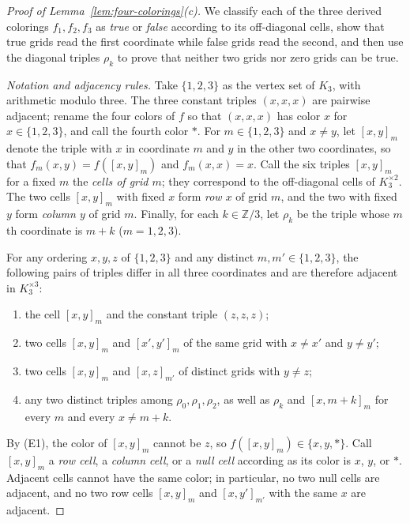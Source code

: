 \begin{proof}[Proof of Lemma~\ref{lem:four-colorings}\textup{(c)}]
We classify each of the three derived colorings $f_1,f_2,f_3$ as \emph{true} or \emph{false} according to its off-diagonal cells, show that true grids read the first coordinate while false grids read the second, and then use the diagonal triples $\rho_k$ to prove that neither two grids nor zero grids can be true.

\emph{Notation and adjacency rules.} Take $\{1,2,3\}$ as the vertex set of $K_3$, with arithmetic modulo three. The three constant triples $(x,x,x)$ are pairwise adjacent; rename the four colors of $f$ so that $(x,x,x)$ has color $x$ for $x\in\{1,2,3\}$, and call the fourth color $\ast$. For $m\in\{1,2,3\}$ and $x\ne y$, let $[x,y]_m$ denote the triple with $x$ in coordinate $m$ and $y$ in the other two coordinates, so that $f_m(x,y)=f([x,y]_m)$ and $f_m(x,x)=x$. Call the six triples $[x,y]_m$ for a fixed $m$ the \emph{cells of grid $m$}; they correspond to the off-diagonal cells of $K_3^{\times2}$. The two cells $[x,y]_m$ with fixed $x$ form \emph{row $x$} of grid $m$, and the two with fixed $y$ form \emph{column $y$} of grid $m$. Finally, for each $k\in\mathbb Z/3$, let $\rho_k$ be the triple whose $m$th coordinate is $m+k$ ($m=1,2,3$).

For any ordering $x,y,z$ of $\{1,2,3\}$ and any distinct $m,m'\in\{1,2,3\}$, the following pairs of triples differ in all three coordinates and are therefore adjacent in $K_3^{\times3}$:
\begin{enumerate}
\item[(E1)] the cell $[x,y]_m$ and the constant triple $(z,z,z)$;
\item[(E2)] two cells $[x,y]_m$ and $[x',y']_m$ of the same grid with $x\ne x'$ and $y\ne y'$;
\item[(E3)] two cells $[x,y]_m$ and $[x,z]_{m'}$ of distinct grids with $y\ne z$;
\item[(E4)] any two distinct triples among $\rho_0,\rho_1,\rho_2$, as well as $\rho_k$ and $[x,m+k]_m$ for every $m$ and every $x\ne m+k$.
\end{enumerate}
By (E1), the color of $[x,y]_m$ cannot be $z$, so $f([x,y]_m)\in\{x,y,\ast\}$. Call $[x,y]_m$ a \emph{row cell}, a \emph{column cell}, or a \emph{null cell} according as its color is $x$, $y$, or $\ast$. Adjacent cells cannot have the same color; in particular, no two null cells are adjacent, and no two row cells $[x,y]_m$ and $[x,y']_{m'}$ with the same $x$ are adjacent.


\end{proof}
